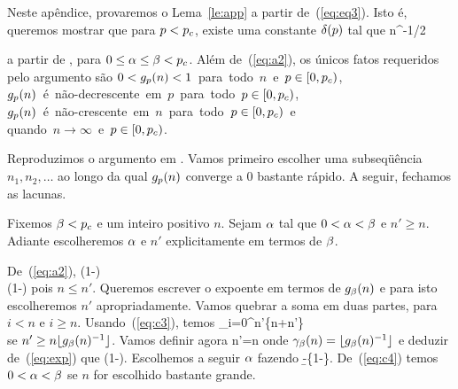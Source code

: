 













Neste apêndice, provaremos o Lema~\ref{le:app} a partir de~(\ref{eq:eq3}).
Isto é, queremos mostrar que
para $p<p_c$, existe uma constante $\delta(p)$ tal que
\beq
\label{eq:a1}
\gpn\leq\delp n^{-1/2}
\eeq

a partir de
\beq 
\label{eq:a2} 
\gan\leq\gbn\exp\left[(\b-\a)-(\b-\a)\frac{n}{\sum_{i=0}^ng_\beta(i)}\right], 
\eeq 
para $0\leq\alpha\leq\beta<p_c$.
Além de~(\ref{eq:a2}), os únicos fatos requeridos pelo argumento são
\beqn
\label{eq:c1}
\mbox{$0<\gpn<1$ para todo $n$ e $p\in[0,\pce)$,}\\
\label{eq:c2}
\mbox{$\gpn$ é não-decrescente em $p$ para todo $p\in[0,\pce)$,}\\
\label{eq:c3}
\mbox{$\gpn$ é não-crescente em $n$ para todo $p\in[0,\pce)$ e}\\
\label{eq:c4}
\gpn{}\quad\mbox{quando $n\to\infty$ e $p\in[0,\pce)$.}
\eeqn

\vs


Reproduzimos o argumento em \cite{kn:G}. Vamos primeiro escolher uma 
subseqüência $n_1,n_2,\ldots$ ao longo da qual $g_p(n)$ converge a $0$
bastante rápido. A seguir, fechamos as lacunas.

Fixemos $\beta<p_c$ e um inteiro positivo $n$. Sejam $\alpha$ tal que $0<\alpha<\beta$ e
$n'\geq n$. Adiante escolheremos $\alpha$ e $n'$ explicitamente em termos de $\beta$.

De~(\ref{eq:a2}),
\beqn
\nonumber
\gal\le\gbl\exp\left(1-\right)\\
\label{eq:exp}
\le\gbn\exp\left(1-\right)
\eeqn
pois $n\leq n'$. Queremos escrever o expoente em termos de $g_{\beta}(n)$ e para
isto escolheremos $n'$ apropriadamente. Vamos quebrar a soma em duas partes,
para $i<n$ e $i\geq n$. Usando~(\ref{eq:c3}), temos
\beqnn
{}\sum_{i=0}^{n'}\gbi\le{}\{n\gbo+n'\gbn\}\\
\gbn
\eeqnn
se $n'\geq n\lfloor g_{\beta}(n)^{-1}\rfloor$. Vamos definir agora
\beq
\label{eq:ga}
n'=n\gabn
\eeq
onde $\gamma_{\beta}(n)=\lfloor g_{\beta}(n)^{-1}\rfloor$ e
deduzir de~(\ref{eq:exp}) que
\beq
\label{eq:gal}
\gal\leq\gbn\exp\left(1-\frac{\b-\a}{3\gbn}\right).
\eeq
Escolhemos a seguir $\alpha$ fazendo
\beq
\label{eq:al}
\b-\gbn\{1-\log\gbn\}.
\eeq
De~(\ref{eq:c4}) temos $0<\alpha<\beta$ se $n$ for escolhido bastante grande.

